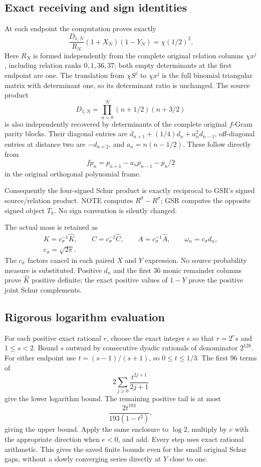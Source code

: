 \subsection{Exact receiving and sign identities}
At each endpoint the computation proves exactly
\[
\frac{D_{1,N}}{R_N}(1+X_N)(1-Y_N)=\chi(1/2)^2.
\]
Here $R_N$ is formed independently from the complete original relation
columns $\chi x^j$, including relation ranks $0,1,36,37$; both empty
determinants at the first endpoint are one. The translation from
$\chi S^j$ to $\chi x^j$ is the full binomial triangular matrix with
determinant one, so its determinant ratio is unchanged. The source
product
\[
D_{1,N}=\prod_{n=0}^N(n+1/2)(n+3/2)
\]
is also independently recovered by determinants of the complete
original $f$-Gram parity blocks. Their diagonal entries are
$d_{n+1}+(1/4)d_n+a_n^2d_{n-1}$, off-diagonal entries at distance two
are $-d_{n+2}$, and $a_n=n(n-1/2)$. These follow directly from
\[
f p_n=p_{n+1}-a_np_{n-1}-p_n/2
\]
in the original orthogonal polynomial frame.

Consequently the four-signed Schur product is exactly reciprocal to
GSR's signed source/relation product. NOTE computes $R^0-R^\sigma$;
GSR computes the opposite signed object $T_k$. No sign convention is
silently changed.

The actual mass is retained as
\[
\begin{gathered}
K=c_\sigma^{-1}\widehat K,\qquad
C=c_\sigma^{-1}\widehat C,\qquad
A=c_\sigma^{-1}\widehat A,\qquad
\omega_n=c_\sigma d_n,\\
c_\sigma=\sqrt{2\pi}.
\end{gathered}
\]
The $c_\sigma$ factors cancel in each paired $X$ and $Y$ expression.
No source probability measure is substituted. Positive $d_n$ and the
first $36$ monic remainder columns prove $\widehat K$ positive definite;
the exact positive values of $1-Y$ prove the positive joint Schur
complements.

\subsection{Rigorous logarithm evaluation}
For each positive exact rational $r$, choose the exact integer $e$
so that $r=2^e s$ and $1\le s<2$. Bound $s$ outward by consecutive
dyadic rationals of denominator $2^{128}$. For either endpoint use
$t=(s-1)/(s+1)$, so $0\le t\le1/3$. The first $96$ terms of
\[
2\sum_{j\ge0}\frac{t^{2j+1}}{2j+1}
\]
give the lower logarithm bound. The remaining positive tail is at most
\[
\frac{2t^{193}}{193(1-t^2)},
\]
giving the upper bound. Apply the same enclosure to $\log2$, multiply
by $e$ with the appropriate direction when $e<0$, and add. Every step
uses exact rational arithmetic. This gives the saved finite bounds
even for the small original Schur gaps, without a slowly converging
series directly at $Y$ close to one.
